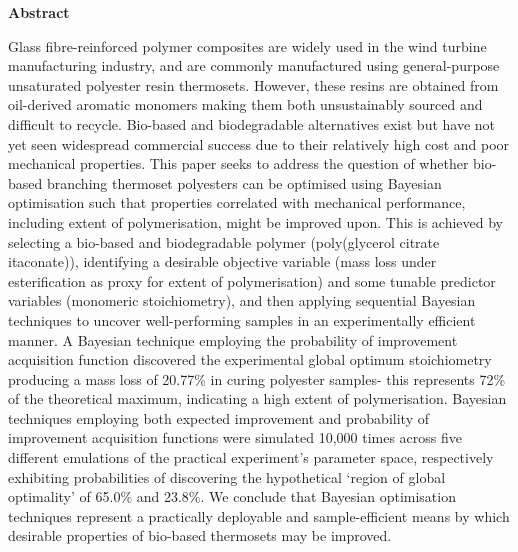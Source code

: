 \begin{center}
    \begin{large}
        \textbf{Abstract}
    \end{large}
    \begin{justify}
        \begin{normalsize}
            Glass fibre-reinforced polymer composites are widely used in the
             wind turbine manufacturing industry, and are commonly manufactured 
             using general-purpose unsaturated polyester resin thermosets.
            However, these resins are obtained from oil-derived aromatic
             monomers making them both unsustainably sourced and difficult
             to recycle.
            Bio-based and biodegradable alternatives exist but have not yet
             seen widespread commercial success due to their relatively
             high cost and poor mechanical properties. 
            This paper seeks to address the question of whether bio-based 
             branching thermoset polyesters can be optimised using Bayesian 
             optimisation such that properties correlated with mechanical
             performance, including extent of polymerisation, 
             might be improved upon.
            This is achieved by selecting a bio-based and biodegradable
             polymer (poly(glycerol citrate itaconate)), identifying a
             desirable objective variable (mass loss under esterification
             as proxy for extent of polymerisation)
             and some tunable predictor variables (monomeric stoichiometry),
             and then applying sequential Bayesian techniques to
             uncover well-performing samples in an experimentally efficient
             manner.
            A Bayesian technique employing the probability of improvement
             acquisition function discovered the experimental global optimum
             stoichiometry producing a mass loss of 20.77\% in curing 
             polyester samples- this represents 72\% of the theoretical 
             maximum, indicating a high extent of polymerisation.
            Bayesian techniques employing both expected improvement and
             probability of improvement acquisition functions were simulated
             10,000 times across five different emulations of the practical
             experiment's parameter space, respectively exhibiting 
             probabilities of discovering the hypothetical `region of global
             optimality' of 65.0\% and 23.8\%.
            We conclude that Bayesian optimisation techniques represent a 
             practically deployable and sample-efficient means by which 
             desirable properties of bio-based thermosets may be improved.
        \end{normalsize}
    \end{justify}
\end{center}

